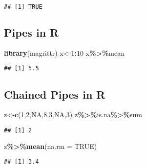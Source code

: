 \documentclass[
]{article}
\newenvironment{Shaded}{\begin{snugshade}}{\end{snugshade}}
\newcommand{\AttributeTok}[1]{\textcolor[rgb]{0.13,0.29,0.53}{#1}}
\newcommand{\ConstantTok}[1]{\textcolor[rgb]{0.56,0.35,0.01}{#1}}
\newcommand{\DecValTok}[1]{\textcolor[rgb]{0.00,0.00,0.81}{#1}}
\newcommand{\FunctionTok}[1]{\textcolor[rgb]{0.13,0.29,0.53}{\textbf{#1}}}
\newcommand{\NormalTok}[1]{#1}
\newcommand{\OtherTok}[1]{\textcolor[rgb]{0.56,0.35,0.01}{#1}}
\newcommand{\SpecialCharTok}[1]{\textcolor[rgb]{0.81,0.36,0.00}{\textbf{#1}}}
\begin{document}
\begin{verbatim}
## [1] TRUE
\end{verbatim}

\subsection{Pipes in R}\label{pipes-in-r}

\begin{Shaded}
\begin{Highlighting}[]
\FunctionTok{library}\NormalTok{(magrittr)}
\NormalTok{x}\OtherTok{\textless{}{-}}\DecValTok{1}\SpecialCharTok{:}\DecValTok{10}
\NormalTok{x}\SpecialCharTok{\%\textgreater{}\%}\NormalTok{mean}
\end{Highlighting}
\end{Shaded}

\begin{verbatim}
## [1] 5.5
\end{verbatim}

\subsection{Chained Pipes in R}\label{chained-pipes-in-r}

\begin{Shaded}
\begin{Highlighting}[]
\NormalTok{z}\OtherTok{\textless{}{-}}\FunctionTok{c}\NormalTok{(}\DecValTok{1}\NormalTok{,}\DecValTok{2}\NormalTok{,}\ConstantTok{NA}\NormalTok{,}\DecValTok{8}\NormalTok{,}\DecValTok{3}\NormalTok{,}\ConstantTok{NA}\NormalTok{,}\DecValTok{3}\NormalTok{)}
\NormalTok{z}\SpecialCharTok{\%\textgreater{}\%}\NormalTok{is.na}\SpecialCharTok{\%\textgreater{}\%}\NormalTok{sum}
\end{Highlighting}
\end{Shaded}

\begin{verbatim}
## [1] 2
\end{verbatim}

\begin{Shaded}
\begin{Highlighting}[]
\NormalTok{z}\SpecialCharTok{\%\textgreater{}\%}\FunctionTok{mean}\NormalTok{(}\AttributeTok{na.rm =} \ConstantTok{TRUE}\NormalTok{)}
\end{Highlighting}
\end{Shaded}

\begin{verbatim}
## [1] 3.4
\end{verbatim}
\end{document}
